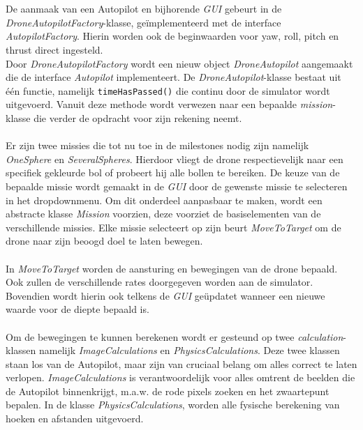 \\
\\
De aanmaak van een Autopilot en bijhorende \textit{GUI} gebeurt in de \textit{DroneAutopilotFactory}-klasse, ge\"implementeerd met de interface \textit{AutopilotFactory}. Hierin worden ook de beginwaarden voor yaw, roll, pitch en thrust direct ingesteld. 
\\
Door \textit{DroneAutopilotFactory} wordt een nieuw object \textit{DroneAutopilot} aangemaakt die de interface \textit{Autopilot} implementeert. De \textit{DroneAutopilot}-klasse bestaat uit één functie, namelijk \texttt{timeHasPassed()} die continu door de simulator wordt uitgevoerd. Vanuit deze methode wordt verwezen naar een bepaalde \textit{mission}-klasse die verder de opdracht voor zijn rekening neemt.
\\
\\
Er zijn twee missies die tot nu toe in de milestones nodig zijn namelijk \textit{OneSphere} en \textit{SeveralSpheres}. Hierdoor vliegt de drone respectievelijk naar een specifiek gekleurde bol of probeert hij alle bollen te bereiken. De keuze van de bepaalde missie wordt gemaakt in de \textit{GUI} door de gewenste missie te selecteren in het dropdownmenu. Om dit onderdeel aanpasbaar te maken, wordt een abstracte klasse \textit{Mission} voorzien, deze voorziet de basiselementen van de verschillende missies.
Elke missie selecteert op zijn beurt \textit{MoveToTarget} om de drone naar zijn beoogd doel te laten bewegen.
\\
\\
In \textit{MoveToTarget} worden de aansturing en bewegingen van de drone bepaald. Ook zullen de verschillende rates doorgegeven worden aan de simulator. Bovendien wordt hierin ook telkens de \textit{GUI} ge\"updatet wanneer een nieuwe waarde voor de diepte bepaald is.
\\
\\
Om de bewegingen te kunnen berekenen wordt er gesteund op twee \textit{calculation}-klassen namelijk \textit{ImageCalculations} en \textit{PhysicsCalculations}. Deze twee klassen staan los van de Autopilot, maar zijn van cruciaal belang om alles correct te laten verlopen. \textit{ImageCalculations} is verantwoordelijk voor alles omtrent de beelden die de Autopilot binnenkrijgt, m.a.w. de rode pixels zoeken en het zwaartepunt bepalen.
In de klasse \textit{PhysicsCalculations}, worden alle fysische berekening van hoeken en afstanden uitgevoerd.
\\
\\
